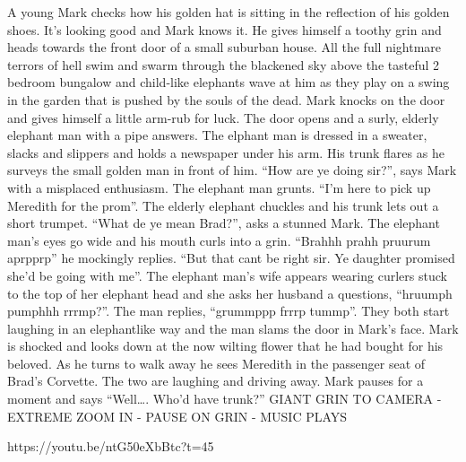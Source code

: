 \begin{multicols}{2}
A young Mark checks how his golden hat is sitting in the reflection of his golden shoes. It’s looking good and Mark knows it. He gives himself a toothy grin and heads towards the front door of a small suburban house. All the full nightmare terrors of hell swim and swarm through the blackened sky above the tasteful 2 bedroom bungalow and child-like elephants wave at him as they play on a swing in the garden that is pushed by the souls of the dead. Mark knocks on the door and gives himself a little arm-rub for luck. The door opens and a surly, elderly elephant man with a pipe answers. The elphant man is dressed in a sweater, slacks and slippers and holds a newspaper under his arm. His trunk flares as he surveys the small golden man in front of him. “How are ye doing sir?”, says Mark with a misplaced enthusiasm. The elephant man grunts. “I’m here to pick up Meredith for the prom”. The elderly elephant chuckles and his trunk lets out a short trumpet. “What de ye mean Brad?”, asks a stunned Mark. The elephant man’s eyes go wide and his mouth curls into a grin. “Brahhh prahh pruurum aprpprp” he mockingly replies. “But that cant be right sir. Ye daughter promised she’d be going with me”. The elephant man’s wife appears wearing curlers stuck to the top of her elephant head and she asks her husband a questions, “hruumph pumphhh rrrmp?”. The man replies, “grummppp frrrp tummp”. They both start laughing in an elephantlike way and the man slams the door in Mark’s face. Mark is shocked and looks down at the now wilting flower that he had bought for his beloved. As he turns to walk away he sees Meredith in the passenger seat of Brad’s Corvette. The two are laughing and driving away. Mark pauses for a moment and says “Well…. Who’d have trunk?” GIANT GRIN TO CAMERA - EXTREME ZOOM IN - PAUSE ON GRIN - MUSIC PLAYS \medskip

https://youtu.be/ntG50eXbBtc?t=45\medskip

\end{multicols}

\vspace*{5mm}

